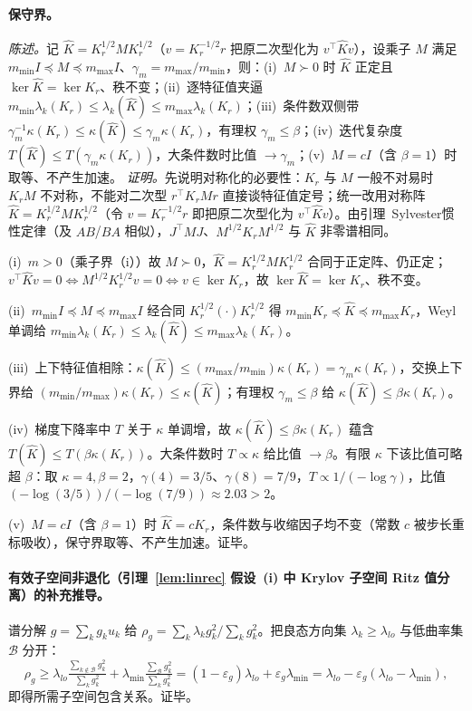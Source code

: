 \documentclass[fontset=windows,11pt]{ctexart}
\numberwithin{equation}{section}
\begin{document}
\paragraph{保守界。}
\emph{陈述。}记 $\widehat K=K_r^{1/2}M K_r^{1/2}$（$v=K_r^{-1/2}r$ 把原二次型化为 $v^\top\widehat K v$），设乘子 $M$ 满足 $m_{\min}I\preceq M\preceq m_{\max}I$、$\gamma_m=m_{\max}/m_{\min}$，则：(i)~$M\succ0$ 时 $\widehat K$ 正定且 $\ker\widehat K=\ker K_r$、秩不变；(ii)~逐特征值夹逼 $m_{\min}\lambda_k(K_r)\le\lambda_k(\widehat K)\le m_{\max}\lambda_k(K_r)$；(iii)~条件数双侧带 $\gamma_m^{-1}\kappa(K_r)\le\kappa(\widehat K)\le\gamma_m\kappa(K_r)$，有理权 $\gamma_m\le\beta$；(iv)~迭代复杂度 $T(\widehat K)\le T(\gamma_m\kappa(K_r))$，大条件数时比值 $\to\gamma_m$；(v)~$M=cI$（含 $\beta=1$）时取等、不产生加速。
\emph{证明。}先说明对称化的必要性：$K_r$ 与 $M$ 一般不对易时 $K_rM$ 不对称，不能对二次型 $r^\top K_rM r$ 直接谈特征值定号；统一改用对称阵 $\widehat K=K_r^{1/2}M K_r^{1/2}$（令 $v=K_r^{-1/2}r$ 即把原二次型化为 $v^\top\widehat K v$）。由引理~Sylvester惯性定律（及 $AB$/$BA$ 相似），$J^\top M J$、$M^{1/2}K_rM^{1/2}$ 与 $\widehat K$ 非零谱相同。
\par\noindent(i)~$m>0$（乘子界（i））故 $M\succ0$，$\widehat K=K_r^{1/2}M K_r^{1/2}$ 合同于正定阵、仍正定；$v^\top\widehat K v=0\iff M^{1/2}K_r^{1/2}v=0\iff v\in\ker K_r$，故 $\ker\widehat K=\ker K_r$、秩不变。
\par\noindent(ii)~$m_{\min}I\preceq M\preceq m_{\max}I$ 经合同 $K_r^{1/2}(\cdot)K_r^{1/2}$ 得 $m_{\min}K_r\preceq\widehat K\preceq m_{\max}K_r$，Weyl 单调给 $m_{\min}\lambda_k(K_r)\le\lambda_k(\widehat K)\le m_{\max}\lambda_k(K_r)$。
\par\noindent(iii)~上下特征值相除：$\kappa(\widehat K)\le(m_{\max}/m_{\min})\kappa(K_r)=\gamma_m\kappa(K_r)$，交换上下界给 $(m_{\min}/m_{\max})\kappa(K_r)\le\kappa(\widehat K)$；有理权 $\gamma_m\le\beta$ 给 $\kappa(\widehat K)\le\beta\kappa(K_r)$。
\par\noindent(iv)~梯度下降率中 $T$ 关于 $\kappa$ 单调增，故 $\kappa(\widehat K)\le\beta\kappa(K_r)$ 蕴含 $T(\widehat K)\le T(\beta\kappa(K_r))$。大条件数时 $T\propto\kappa$ 给比值 $\to\beta$。有限 $\kappa$ 下该比值可略超 $\beta$：取 $\kappa=4,\beta=2$，$\gamma(4)=3/5$、$\gamma(8)=7/9$，$T\propto1/(-\log\gamma)$，比值 $(-\log(3/5))/(-\log(7/9))\approx2.03>2$。
\par\noindent(v)~$M=cI$（含 $\beta=1$）时 $\widehat K=cK_r$，条件数与收缩因子均不变（常数 $c$ 被步长重标吸收），保守界取等、不产生加速。证毕。

\paragraph{有效子空间非退化（引理~\ref{lem:linrec} 假设~(i) 中 Krylov 子空间 Ritz 值分离）的补充推导。}
谱分解 $g=\sum_kg_ku_k$ 给 $\rho_g=\sum_k\lambda_kg_k^2/\sum_kg_k^2$。把良态方向集 $\lambda_k\ge\lambda_{lo}$ 与低曲率集 $\mathcal B$ 分开：
\[
\rho_g\ge\lambda_{lo}\tfrac{\sum_{k\notin\mathcal B}g_k^2}{\sum_kg_k^2}+\lambda_{\min}\tfrac{\sum_{\mathcal B}g_k^2}{\sum_kg_k^2}
=(1-\varepsilon_g)\lambda_{lo}+\varepsilon_g\lambda_{\min}=\lambda_{lo}-\varepsilon_g(\lambda_{lo}-\lambda_{\min}),
\]
即得所需子空间包含关系。证毕。
\end{document}

